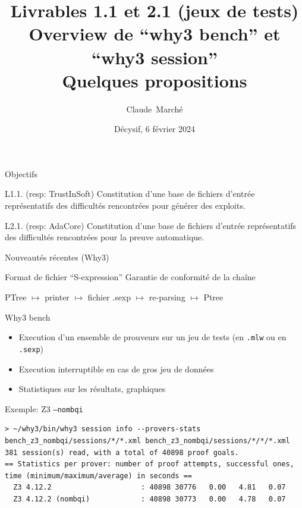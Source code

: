 \documentclass{beamer}
\title{Livrables 1.1 et 2.1 (jeux de tests) \\
  Overview de ``why3 bench'' et ``why3 session''\\
  Quelques propositions}
\author{Claude~Marché\inst{1}}
\institute{\inst{1} Université Paris-Saclay, Inria \& LMF }
\date{Décysif, 6 février 2024}
\newcommand{\why}{\lstinline[language=why3]}
\begin{document}

\begin{frame}{}
  \maketitle
\end{frame}


\begin{frame}{Objectifs}

  \begin{block}{L1.1. (resp: TrustInSoft)}
    Constitution d’une base de fichiers d’entrée représentatifs des
    difficultés rencontrées pour générer des exploits.
  \end{block}

  \begin{block}{L2.1. (resp: AdaCore)}
    Constitution d’une base de fichiers d’entrée représentatifs des
    difficultés rencontrées pour la preuve automatique.
  \end{block}

\end{frame}

\begin{frame}{Nouveautés récentes (Why3)}

  \begin{block}{Format de fichier ``S-expression''}
    Garantie de conformité de la chaîne
    \begin{center}
    PTree $\mapsto$ printer
    $\mapsto$ fichier .sexp $\mapsto$ re-parsing $\mapsto$ Ptree
  \end{center}
  \end{block}


  \begin{block}{Why3 bench}
    \begin{itemize}
    \item Execution d'un ensemble de prouveurs sur un jeu de tests
      (en \why{.mlw} ou en \why{.sexp})
    \item Execution interruptible en cas de gros jeu de données
    \item Statistiques sur les résultats, graphiques
    \end{itemize}

  \end{block}

\end{frame}


\begin{frame}[fragile]{Exemple: Z3 \texttt{--nombqi}}

\begin{lstlisting}
> ~/why3/bin/why3 session info --provers-stats bench_z3_nombqi/sessions/*/*.xml bench_z3_nombqi/sessions/*/*/*.xml
381 session(s) read, with a total of 40898 proof goals.
== Statistics per prover: number of proof attempts, successful ones, time (minimum/maximum/average) in seconds ==
  Z3 4.12.2                     : 40898 30776   0.00   4.81   0.07
  Z3 4.12.2 (nombqi)            : 40898 30773   0.00   4.78   0.07
\end{lstlisting}

\end{frame}
\end{document}
